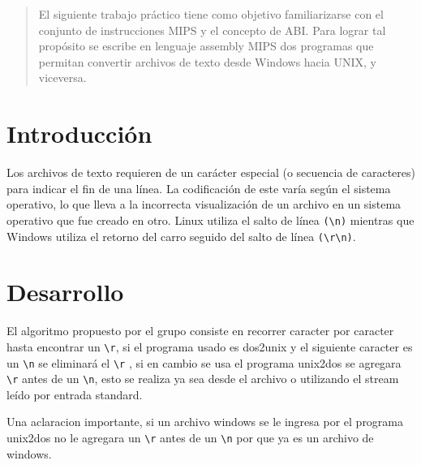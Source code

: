 \documentclass[a4paper]{article}
\begin{document}

\fecha{\today}



\maketitle

\renewcommand{\abstractname}{Resumen} 
\begin{abstract}
El siguiente trabajo práctico tiene como objetivo familiarizarse con el conjunto de instrucciones MIPS y el concepto de ABI. Para lograr tal propósito se escribe en lenguaje assembly MIPS dos programas que permitan convertir archivos de texto desde Windows hacia UNIX, y viceversa.
\end{abstract}


\section{Introducción}
Los archivos de texto requieren de un carácter especial (o secuencia de caracteres) para indicar el fin de una línea. La codificación de este varía según el sistema operativo, lo que lleva a la incorrecta visualización de un archivo en un sistema operativo que fue creado en otro. Linux utiliza el salto de línea \verb|(\n)| mientras que Windows utiliza el retorno del carro seguido del salto de línea \verb|(\r\n)|.

\section{Desarrollo}

El algoritmo propuesto por el grupo consiste en recorrer caracter por caracter hasta encontrar un \verb|\r|, si el programa usado es dos2unix y el siguiente caracter es un \verb|\n| se eliminará el \verb|\r| , si en cambio se usa el programa unix2dos se agregara \verb|\r| antes de un \verb|\n|, esto se realiza ya sea desde el archivo o utilizando el stream leído por entrada standard.

Una aclaracion importante, si un archivo windows se le ingresa por el programa unix2dos no le agregara un \verb|\r| antes de un \verb|\n| por que ya es un archivo de windows.
\end{document}
